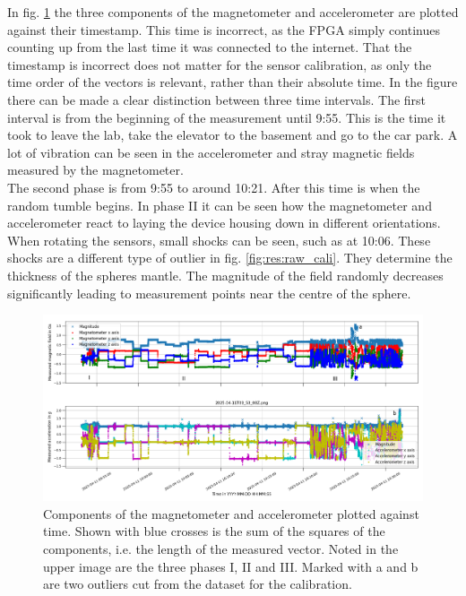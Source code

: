 In fig. \ref{fig:res:raw_cali_vectors} the three components of the magnetometer and accelerometer are plotted against their timestamp. This time is incorrect, as the \ac{FPGA} simply continues counting up from the last time it was connected to the internet. That the timestamp is incorrect does not matter for the sensor calibration, as only the time order of the vectors is relevant, rather than their absolute time. In the figure there can be made a clear distinction between three time intervals. The first interval is from the beginning of the measurement until 9:55. This is the time it took to leave the lab, take the elevator to the basement and go to the car park. A lot of vibration can be seen in the accelerometer and stray magnetic fields measured by the magnetometer.\\
The second phase is from 9:55 to around 10:21. After this time is when the random tumble begins. In phase II it can be seen how the magnetometer and accelerometer react to laying the device housing down in different orientations. When rotating the sensors, small shocks can be seen, such as at 10:06. These shocks are a different type of outlier in fig. \ref{fig:res:raw_cali}. They determine the thickness of the spheres mantle. The magnitude of the field randomly decreases significantly leading to measurement points near the centre of the sphere.

\begin{figure}[H]
    \centering
    \includegraphics[width=\linewidth]{images/04_results/raw_vectors-2025-04-11.png}
    \caption[Components of the magnetometer and accelerometer plotted against time.]{Components of the magnetometer and accelerometer plotted against time. Shown with blue crosses is the sum of the squares of the components, i.e. the length of the measured vector. Noted in the upper image are the three phases I, II and III. Marked with a and b are two outliers cut from the dataset for the calibration.}
    \label{fig:res:raw_cali_vectors}
\end{figure}

